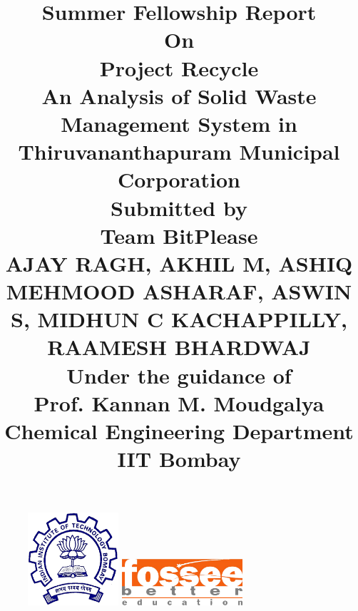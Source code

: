 \documentclass[12pt,a4paper]{report}
\begin{document}
\begin{figure}
	\centering
	\includegraphics[width = 0.3\textwidth]{iit}
	\hspace{1cm}
	\includegraphics[width = 0.4\textwidth]{fossee-logo}
\end{figure}

\title
	{\textbf
			{\textbf
				{Summer Fellowship Report}}
				\vspace{5mm} 
				\\\small On 
				\\\vspace{5mm} 
				\textbf
				{\large Project Recycle \\ An Analysis of Solid Waste Management System in Thiruvananthapuram Municipal Corporation}
				\vspace{5mm} 
				\\\vspace{5mm}
				\small Submitted by
				\\\vspace{5mm}  
				\large 
				\textbf
					{Team BitPlease}
					\small \\ AJAY RAGH, AKHIL M, ASHIQ MEHMOOD ASHARAF, ASWIN S, MIDHUN C KACHAPPILLY, RAAMESH BHARDWAJ
					\\ \vspace{5mm}
				\small Under the guidance of \\ \vspace{5mm}
				\large 
				\textbf{Prof. Kannan M. Moudgalya} 
				\vspace{1mm}\\ Chemical Engineering Department  \vspace{1mm} \\IIT Bombay
}
\vspace{1cm}


\maketitle
\end{document}
